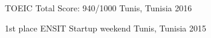 



\begin{cvhonors}

  \cvhonor
    {TOEIC} %
    {Total Score: 940/1000} %
    {Tunis, Tunisia} %
    {2016} %

\end{cvhonors}




\begin{cvhonors}

  \cvhonor
	{1st place} %
	{ENSIT Startup weekend} %
	{Tunis, Tunisia} %
	{2015} %
\end{cvhonors}
